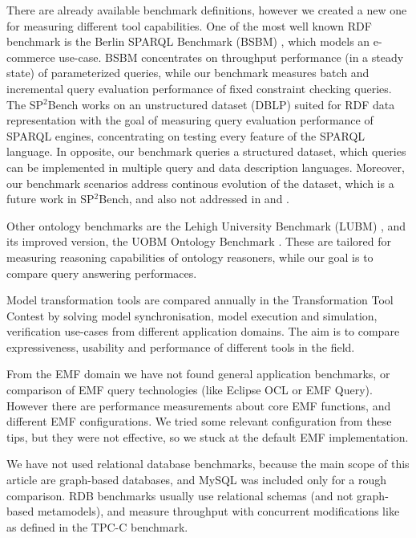 There are already available benchmark definitions, however we created a new one
for measuring different tool capabilities. One of the most well known RDF
benchmark is the Berlin SPARQL Benchmark (BSBM) \cite{BerlinBenchmark}, which
models an e-commerce use-case. BSBM concentrates on throughput performance (in a
steady state) of parameterized queries, while our benchmark measures batch and
incremental query evaluation performance of fixed constraint checking queries.
The SP$^2$Bench \cite{SP2Bench} works on an unstructured dataset (DBLP) suited
for RDF data representation with the goal of measuring query evaluation
performance of SPARQL engines, concentrating on testing every feature of the
SPARQL language. In opposite, our benchmark queries a structured dataset, which
queries can be implemented in multiple query and data description languages.
Moreover, our benchmark scenarios address continous evolution of the dataset,
which is a future work in SP$^2$Bench, and also not addressed in \cite{SIB} and
\cite{DBpediaSparql}.

Other ontology benchmarks are the Lehigh University Benchmark (LUBM)
\cite{LUBMBenchmark}, and its improved version, the UOBM Ontology Benchmark
\cite{UOBM}. These are tailored for measuring reasoning capabilities of ontology
reasoners, while our goal is to compare query answering performaces.

Model transformation tools are compared annually in the Transformation Tool
Contest \cite{TTC} by solving model synchronisation, model execution and
simulation, verification use-cases from different application domains. The aim
is to compare expressiveness, usability and performance of different
tools in the field. 

From the EMF domain we have not found general application benchmarks, or
comparison of EMF query technologies (like Eclipse OCL or EMF Query). However
there are performance measurements \cite{EMF-performance} about core EMF
functions, and different EMF configurations. We tried some relevant
configuration from these tips, but they were not effective, so we stuck at the
default EMF implementation.

We have not used relational database benchmarks, because the main scope of this
article are graph-based databases, and MySQL was included only for a rough
comparison. RDB benchmarks usually use relational schemas (and not graph-based
metamodels), and measure throughput with concurrent modifications like as
defined in the TPC-C \cite{tpc-c} benchmark.

